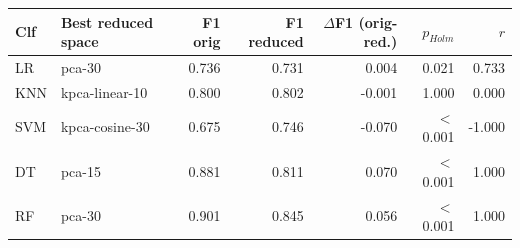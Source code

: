 \begin{tabular}{llrrrrr}
\toprule
Clf & Best reduced space & F1 orig & F1 reduced & $\Delta$F1 (orig-red.) & $p_{Holm}$ & $r$ \\
\midrule
LR & pca-30 & 0.736 & 0.731 & 0.004 & 0.021 & 0.733 \\
KNN & kpca-linear-10 & 0.800 & 0.802 & -0.001 & 1.000 & 0.000 \\
SVM & kpca-cosine-30 & 0.675 & 0.746 & -0.070 & $<$0.001 & -1.000 \\
DT & pca-15 & 0.881 & 0.811 & 0.070 & $<$0.001 & 1.000 \\
RF & pca-30 & 0.901 & 0.845 & 0.056 & $<$0.001 & 1.000 \\
\bottomrule
\end{tabular}
